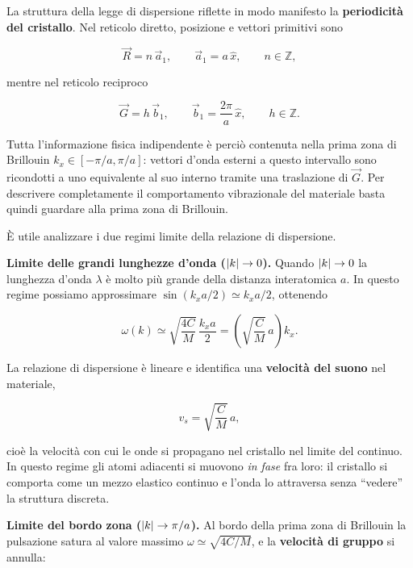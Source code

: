 La struttura della legge di dispersione riflette in modo manifesto la \textbf{periodicità del cristallo}. Nel reticolo diretto, posizione e vettori primitivi sono

\begin{equation}
    \vec{R} = n \, \vec{a}_1, \qquad \vec{a}_1 = a \, \hat{x}, \qquad n \in \mathbb{Z},
\end{equation}

mentre nel reticolo reciproco

\begin{equation}
    \vec{G} = h \, \vec{b}_1, \qquad \vec{b}_1 = \frac{2\pi}{a} \, \hat{x}, \qquad h \in \mathbb{Z}.
\end{equation}

Tutta l'informazione fisica indipendente è perciò contenuta nella prima zona di Brillouin \( k_x \in [-\pi/a, \pi/a] \): vettori d'onda esterni a questo intervallo sono ricondotti a uno equivalente al suo interno tramite una traslazione di \( \vec{G} \). Per descrivere completamente il comportamento vibrazionale del materiale basta quindi guardare alla prima zona di Brillouin.

È utile analizzare i due regimi limite della relazione di dispersione.

\textbf{Limite delle grandi lunghezze d'onda (\( \abs{k} \to 0 \)).} Quando \( \abs{k} \to 0 \) la lunghezza d'onda \( \lambda \) è molto più grande della distanza interatomica \( a \). In questo regime possiamo approssimare \( \sin(k_x a / 2) \simeq k_x a / 2 \), ottenendo

\begin{equation}
    \omega(k) \simeq \sqrt{\frac{4C}{M}} \, \frac{k_x a}{2} = \left( \sqrt{\frac{C}{M}} \, a \right) k_x.
\end{equation}

La relazione di dispersione è lineare e identifica una \textbf{velocità del suono} nel materiale,

\begin{equation}
    v_s = \sqrt{\frac{C}{M}} \, a,
\end{equation}

cioè la velocità con cui le onde si propagano nel cristallo nel limite del continuo. In questo regime gli atomi adiacenti si muovono \emph{in fase} fra loro: il cristallo si comporta come un mezzo elastico continuo e l'onda lo attraversa senza ``vedere'' la struttura discreta.

\textbf{Limite del bordo zona (\( \abs{k} \to \pi/a \)).} Al bordo della prima zona di Brillouin la pulsazione satura al valore massimo \( \omega \simeq \sqrt{4C/M} \), e la \textbf{velocità di gruppo} si annulla:

